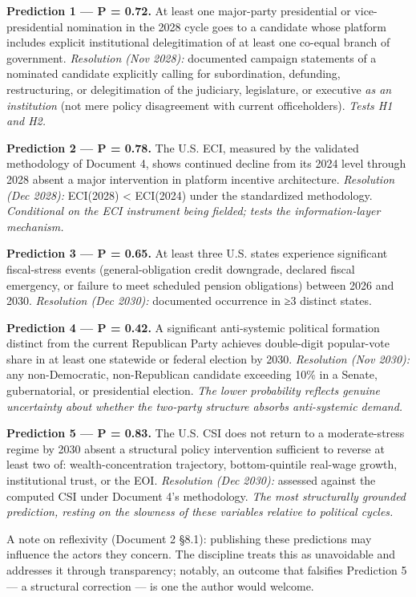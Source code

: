 \documentclass[
]{article}
\begin{document}
\textbf{Prediction 1 --- P = 0.72.} At least one major-party
presidential or vice-presidential nomination in the 2028 cycle goes to a
candidate whose platform includes explicit institutional delegitimation
of at least one co-equal branch of government. \emph{Resolution (Nov
2028):} documented campaign statements of a nominated candidate
explicitly calling for subordination, defunding, restructuring, or
delegitimation of the judiciary, legislature, or executive \emph{as an
institution} (not mere policy disagreement with current officeholders).
\emph{Tests H1 and H2.}

\textbf{Prediction 2 --- P = 0.78.} The U.S. ECI, measured by the
validated methodology of Document 4, shows continued decline from its
2024 level through 2028 absent a major intervention in platform
incentive architecture. \emph{Resolution (Dec 2028):} ECI(2028)
\textless{} ECI(2024) under the standardized methodology.
\emph{Conditional on the ECI instrument being fielded; tests the
information-layer mechanism.}

\textbf{Prediction 3 --- P = 0.65.} At least three U.S. states
experience significant fiscal-stress events (general-obligation credit
downgrade, declared fiscal emergency, or failure to meet scheduled
pension obligations) between 2026 and 2030. \emph{Resolution (Dec
2030):} documented occurrence in ≥3 distinct states.

\textbf{Prediction 4 --- P = 0.42.} A significant anti-systemic
political formation distinct from the current Republican Party achieves
double-digit popular-vote share in at least one statewide or federal
election by 2030. \emph{Resolution (Nov 2030):} any non-Democratic,
non-Republican candidate exceeding 10\% in a Senate, gubernatorial, or
presidential election. \emph{The lower probability reflects genuine
uncertainty about whether the two-party structure absorbs anti-systemic
demand.}

\textbf{Prediction 5 --- P = 0.83.} The U.S. CSI does not return to a
moderate-stress regime by 2030 absent a structural policy intervention
sufficient to reverse at least two of: wealth-concentration trajectory,
bottom-quintile real-wage growth, institutional trust, or the EOI.
\emph{Resolution (Dec 2030):} assessed against the computed CSI under
Document 4's methodology. \emph{The most structurally grounded
prediction, resting on the slowness of these variables relative to
political cycles.}

A note on reflexivity (Document 2 §8.1): publishing these predictions
may influence the actors they concern. The discipline treats this as
unavoidable and addresses it through transparency; notably, an outcome
that falsifies Prediction 5 --- a structural correction --- is one the
author would welcome.
\end{document}
